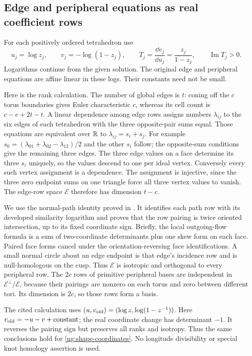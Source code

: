 \subsection{Edge and peripheral equations as real coefficient rows}
For each positively ordered tetrahedron use
\begin{equation}\label{ng:shape-coordinates}
 u_j=\log z_j,\qquad v_j=-\log(1-z_j),\qquad
 T_j=\frac{\dd v_j}{\dd u_j}=\frac{z_j}{1-z_j},
 \qquad \operatorname{Im}T_j>0 .
\end{equation}
Logarithms continue from the given solution. The original edge and
peripheral equations are affine linear in these logs. Their constants
need not be small.

Here is the rank calculation. The number of global edges is $t$:
coning off the $c$ torus boundaries gives Euler characteristic $c$,
whereas its cell count is $c-e+2t-t$. A linear dependence among edge
rows assigns numbers $\lambda_{ij}$ to the six edges of each
tetrahedron with the three opposite-pair sums equal.
Those equations are equivalent over $\mathbb R$ to
$\lambda_{ij}=s_i+s_j$. For example
$s_0=(\lambda_{01}+\lambda_{02}-\lambda_{12})/2$ and the
other $s_i$ follow; the opposite-sum conditions give the remaining
three edges. The three edge values on a face determine its three
$s_i$ uniquely, so the values descend to one per ideal vertex.
Conversely every such vertex assignment is a dependence.
The assignment is injective, since the three zero endpoint sums
on one triangle force all three vertex values to vanish.
The edge-row space $\mathcal E$ therefore has dimension $t-c$.

We use the normal-path identity proved in
\cite[Section~7.1, equations~(7.1)--(7.2)]{Marked}.
It identifies each path row with its developed similarity logarithm
and proves that the row pairing is twice oriented intersection,
up to its fixed coordinate sign. Briefly, the local outgoing-flow
formula is a sum of two-coordinate determinants plus one skew form
on each face. Paired face forms cancel under the orientation-reversing
face identifications. A small normal circle about an edge endpoint
is that edge's incidence row and is null-homologous on the cusp.
Thus $\mathcal E$ is isotropic and orthogonal to every peripheral
row. The $2c$ rows of primitive peripheral bases are independent
in $\mathcal E^\perp/\mathcal E$, because their pairings are
nonzero on each torus and zero between different tori.
Its dimension is $2c$, so those rows form a basis.

The cited calculation uses $(u,v_{\rm old})=(\log z,\log(1-z^{-1}))$.
Here $v_{\rm old}=-u-v+\text{constant}$; the real coordinate
change has determinant $-1$. It reverses the pairing sign but
preserves all ranks and isotropy. Thus the same conclusions hold
for \eqref{ng:shape-coordinates}. No longitude divisibility or
special knot homology assertion is used.

